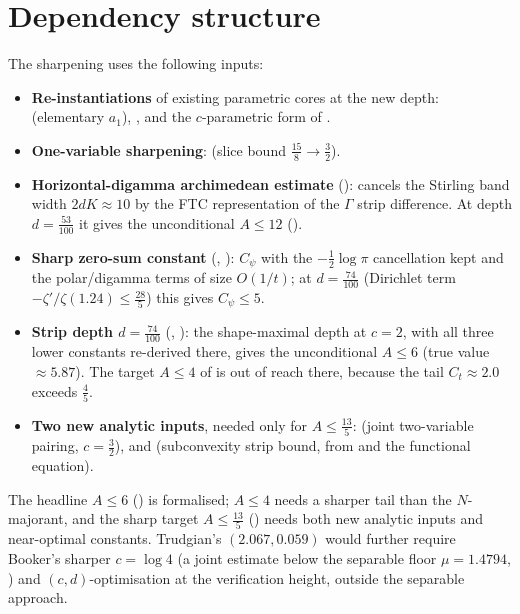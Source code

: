 \section{Dependency structure}
\label{sec:ls_roadmap}

The sharpening uses the following inputs:
\begin{itemize}
  \item \textbf{Re-instantiations} of existing parametric cores at the new depth:
         (elementary $a_1$), , and the
        $c$-parametric form of .
  \item \textbf{One-variable sharpening}:  (slice bound
        $\tfrac{15}8\to\tfrac32$).
  \item \textbf{Horizontal-digamma archimedean estimate} (): cancels
        the Stirling band width $2dK\approx10$ by the FTC representation of the $\Gamma$
        strip difference. At depth $d=\tfrac{53}{100}$ it gives the unconditional $A\le12$
        ().
  \item \textbf{Sharp zero-sum constant} (,
        ): $C_\psi$ with the
        $-\tfrac12\log\pi$ cancellation kept and the polar/digamma terms of size $O(1/t)$;
        at $d=\tfrac{74}{100}$ (Dirichlet term $-\zeta'/\zeta(1.24)\le\tfrac{28}5$) this gives
        $C_\psi\le5$.
  \item \textbf{Strip depth $d=\tfrac{74}{100}$} (,
        ): the shape-maximal depth at
        $c=2$, with all three lower constants re-derived there, gives the unconditional
        $A\le6$ (true value $\approx5.87$). The target $A\le4$ of
         is out of reach there, because the tail
        $C_t\approx2.0$ exceeds $\tfrac45$.
  \item \textbf{Two new analytic inputs}, needed only for $A\le\tfrac{13}5$:
         (joint two-variable pairing, $c=\tfrac32$), and
         (subconvexity strip bound, from
         and the functional equation).
\end{itemize}
The headline $A\le6$ () is formalised; $A\le4$ needs a
sharper tail than the $N$-majorant, and the sharp target $A\le\tfrac{13}5$
() needs both new analytic inputs and near-optimal constants.
Trudgian's $(2.067,0.059)$ \cite{TrudgianTuring} would further require Booker's sharper
$c=\log4$ (a joint estimate below the separable floor $\mu=1.4794$, )
and $(c,d)$-optimisation at the verification height, outside the separable approach.
